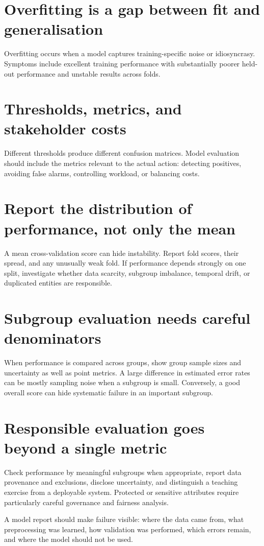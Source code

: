 \section{Overfitting is a gap between fit and generalisation}
Overfitting occurs when a model captures training-specific noise or idiosyncrasy. Symptoms include excellent training performance with substantially poorer held-out performance and unstable results across folds.

\section{Thresholds, metrics, and stakeholder costs}
Different thresholds produce different confusion matrices. Model evaluation should include the metrics relevant to the actual action: detecting positives, avoiding false alarms, controlling workload, or balancing costs.


\section{Report the distribution of performance, not only the mean}
A mean cross-validation score can hide instability. Report fold scores, their spread, and any unusually weak fold. If performance depends strongly on one split, investigate whether data scarcity, subgroup imbalance, temporal drift, or duplicated entities are responsible.

\section{Subgroup evaluation needs careful denominators}
When performance is compared across groups, show group sample sizes and uncertainty as well as point metrics. A large difference in estimated error rates can be mostly sampling noise when a subgroup is small. Conversely, a good overall score can hide systematic failure in an important subgroup.


\section{Responsible evaluation goes beyond a single metric}
Check performance by meaningful subgroups when appropriate, report data provenance and exclusions, disclose uncertainty, and distinguish a teaching exercise from a deployable system. Protected or sensitive attributes require particularly careful governance and fairness analysis.

\begin{keyidea}
A model report should make failure visible: where the data came from, what preprocessing was learned, how validation was performed, which errors remain, and where the model should not be used.
\end{keyidea}

